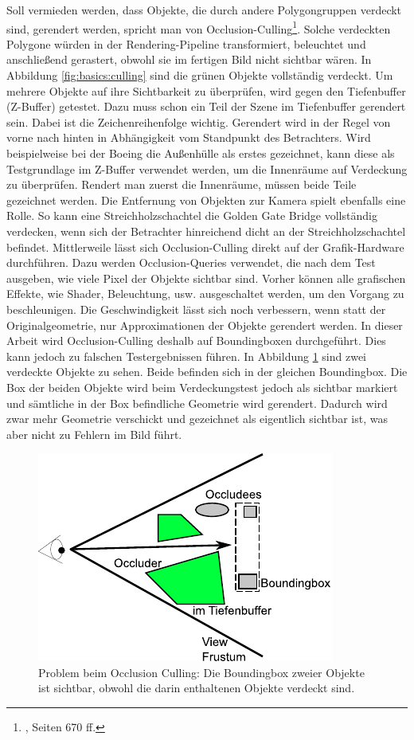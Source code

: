 Soll vermieden werden, dass Objekte, die durch andere Polygongruppen verdeckt sind, gerendert werden, spricht man von Occlusion-Culling\footnote{\cite{RTR3}, Seiten 670 ff.}. Solche verdeckten Polygone würden in der Rendering-Pipeline transformiert, beleuchtet und anschließend gerastert, obwohl sie im fertigen Bild nicht sichtbar wären. In Abbildung \ref{fig:basics:culling} sind die grünen Objekte vollständig verdeckt. Um mehrere Objekte auf ihre Sichtbarkeit zu überprüfen, wird gegen den Tiefenbuffer (Z-Buffer) getestet. Dazu muss schon ein Teil der Szene im Tiefenbuffer gerendert sein. Dabei ist die Zeichenreihenfolge wichtig. Gerendert wird in der Regel von vorne nach hinten in Abhängigkeit vom Standpunkt des Betrachters. Wird beispielweise bei der Boeing die Außenhülle als erstes gezeichnet, kann diese als Testgrundlage im Z-Buffer verwendet werden, um die Innenräume auf Verdeckung zu überprüfen. Rendert man zuerst die Innenräume, müssen beide Teile gezeichnet werden. Die Entfernung von Objekten zur Kamera spielt ebenfalls eine Rolle. So kann eine Streichholzschachtel die Golden Gate Bridge vollständig verdecken, wenn sich der Betrachter hinreichend dicht an der Streichholzschachtel befindet. Mittlerweile lässt sich Occlusion-Culling direkt auf der Grafik-Hardware durchführen. Dazu werden Occlusion-Queries verwendet, die nach dem Test ausgeben, wie viele Pixel der Objekte sichtbar sind. Vorher können alle grafischen Effekte, wie Shader, Beleuchtung, usw. ausgeschaltet werden, um den Vorgang zu beschleunigen. Die Geschwindigkeit lässt sich noch verbessern, wenn statt der Originalgeometrie, nur Approximationen der Objekte gerendert werden. In dieser Arbeit wird Occlusion-Culling deshalb auf Boundingboxen durchgeführt. Dies kann jedoch zu falschen Testergebnissen führen. In Abbildung \ref{fig:basics:oculling} sind zwei verdeckte Objekte zu sehen. Beide befinden sich in der gleichen Boundingbox. Die Box der beiden Objekte wird beim Verdeckungstest jedoch als sichtbar markiert und sämtliche in der Box befindliche Geometrie wird gerendert. Dadurch wird zwar mehr Geometrie verschickt und gezeichnet als eigentlich sichtbar ist, was aber nicht zu Fehlern im Bild führt.
\begin{figure}
  \centering
  \includegraphics[scale=0.8]{images/oculling.pdf}
  \caption{Problem beim Occlusion Culling: Die Boundingbox zweier Objekte ist sichtbar, obwohl die darin enthaltenen Objekte verdeckt sind.}
  \label{fig:basics:oculling}
\end{figure}

